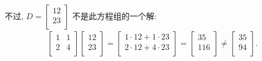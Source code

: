 \begin{example}
    不过,
    \(
    D = \begin{bmatrix}
        12 \\
        23 \\
    \end{bmatrix}
    \)
    不是此方程组的一个解:
    \begin{align*}
        \begin{bmatrix}
            1 & 1 \\
            2 & 4 \\
        \end{bmatrix}
        \begin{bmatrix}
            12 \\
            23 \\
        \end{bmatrix}
        =
        \begin{bmatrix}
            1 \cdot 12 + 1 \cdot 23 \\
            2 \cdot 12 + 4 \cdot 23 \\
        \end{bmatrix}
        =
        \begin{bmatrix}
            35  \\
            116 \\
        \end{bmatrix}
        \neq
        \begin{bmatrix}
            35 \\
            94 \\
        \end{bmatrix}.
    \end{align*}
\end{example}

